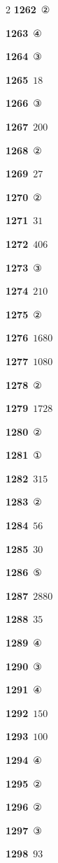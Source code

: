 \documentclass[10pt,a4paper]{article}
\begin{document}
\begin{multicols}{2}
\noindent\textbf{1262}\ ②\par
\noindent\textbf{1263}\ ④\par
\noindent\textbf{1264}\ ③\par
\noindent\textbf{1265}\ $18$\par
\noindent\textbf{1266}\ ③\par
\noindent\textbf{1267}\ $200$\par
\noindent\textbf{1268}\ ②\par
\noindent\textbf{1269}\ $27$\par
\noindent\textbf{1270}\ ②\par
\noindent\textbf{1271}\ $31$\par
\noindent\textbf{1272}\ $406$\par
\noindent\textbf{1273}\ ③\par
\noindent\textbf{1274}\ $210$\par
\noindent\textbf{1275}\ ②\par
\noindent\textbf{1276}\ $1680$\par
\noindent\textbf{1277}\ $1080$\par
\noindent\textbf{1278}\ ②\par
\noindent\textbf{1279}\ $1728$\par
\noindent\textbf{1280}\ ②\par
\noindent\textbf{1281}\ ①\par
\noindent\textbf{1282}\ $315$\par
\noindent\textbf{1283}\ ②\par
\noindent\textbf{1284}\ $56$\par
\noindent\textbf{1285}\ $30$\par
\noindent\textbf{1286}\ ⑤\par
\noindent\textbf{1287}\ $2880$\par
\noindent\textbf{1288}\ $35$\par
\noindent\textbf{1289}\ ④\par
\noindent\textbf{1290}\ ③\par
\noindent\textbf{1291}\ ④\par
\noindent\textbf{1292}\ $150$\par
\noindent\textbf{1293}\ $100$\par
\noindent\textbf{1294}\ ④\par
\noindent\textbf{1295}\ ②\par
\noindent\textbf{1296}\ ②\par
\noindent\textbf{1297}\ ③\par
\noindent\textbf{1298}\ $93$\par

\end{multicols}
\end{document}
